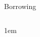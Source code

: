 \documentclass[11pt,aspectratio=43,usenames,dvipsnames]{beamer}
\let\olditemize=\itemize
\let\endolditemize=\enditemize
\renewenvironment{itemize}{\olditemize \itemsep1em}{\endolditemize}
\theoremstyle{definition}
\begin{document}
\begin{frame}{Borrowing}
\begin{columns}
\begin{column}{0.5\textwidth}
{\begin{itemize}
            \end{itemize}
            }
        \end{column}
        \begin{column}{0.5\textwidth}
            \begin{figure}
                \centering
            \end{figure}
        \end{column}
    \end{columns}
\end{frame}
\end{document}
